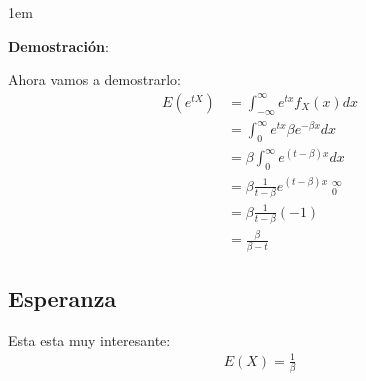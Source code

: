 \documentclass[12pt, fleqn]{report}                             %
\newenvironment{SmallIndentation}[1][0.75em]                    %
        {\begin{adjustwidth}{#1}{}\begin{footnotesize}}             %
        {\end{footnotesize}\end{adjustwidth}}                       %
\theoremstyle{break}                                            %
\DeclareMathOperator \Evaluate  {\Big|}                         %
\begin{document}
                \begin{SmallIndentation}[1em]
                    \textbf{Demostración}:
                    
                    Ahora vamos a demostrarlo:
                    \begin{align*}
                        E(e^{tX}) 
                            &= \int_{-\infty}^\infty e^{tx} f_X (x) dx                      \\
                            &= \int_0^\infty e^{tx} \beta e^{-\beta x} dx                   \\
                            &= \beta \int_0^\infty e^{(t -\beta) x} dx                      \\
                            &= \beta \frac{1}{t-\beta} e^{(t -\beta) x} \Evaluate_0^\infty  \\
                            &= \beta \frac{1}{t-\beta} (-1)                                 \\
                            &= \frac{\beta}{\beta-t}
                    \end{align*}

                \end{SmallIndentation}
                    


            \vspace{1em}
            \subsection{Esperanza}

                Esta esta muy interesante:
                \begin{align*}
                    E(X) = \frac{1}{\beta}                    
                \end{align*}
\end{document}
